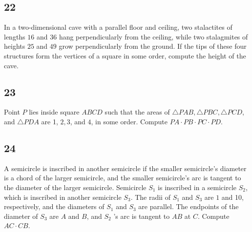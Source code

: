\subsection{22}
In a two-dimensional cave with a parallel floor and ceiling, two stalactites of lengths $16$ and $36$ hang perpendicularly from the ceiling, while two stalagmites of heights $25$ and $49$ grow perpendicularly from the ground. If the tips of these four structures form the vertices of a square in some order, compute the height of the cave.

\subsection{23}
Point $P$ lies inside square $A B C D$ such that the areas of $\triangle P A B, \triangle P B C, \triangle P C D$, and $\triangle P D A$ are 1, $2,3$, and $4$, in some order. Compute $P A \cdot P B \cdot P C \cdot P D$.

\subsection{24}
A semicircle is inscribed in another semicircle if the smaller semicircle's diameter is a chord of the larger semicircle, and the smaller semicircle's arc is tangent to the diameter of the larger semicircle.
Semicircle $S_{1}$ is inscribed in a semicircle $S_{2}$, which is inscribed in another semicircle $S_{3}$. The radii of $S_{1}$ and $S_{3}$ are $1$ and 10, respectively, and the diameters of $S_{1}$ and $S_{3}$ are parallel. The endpoints of the diameter of $S_{3}$ are $A$ and $B$, and $S_{2}$ 's arc is tangent to $A B$ at $C$. Compute $A C \cdot C B$.


